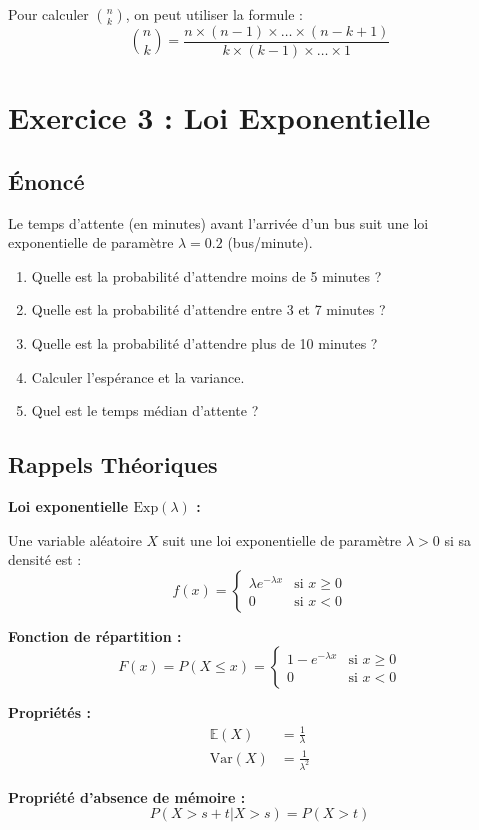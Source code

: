 \documentclass[11pt,a4paper]{article}
\newcommand{\Var}{\text{Var}}
\newcommand{\E}{\mathbb{E}}
\newcommand{\Exp}{\text{Exp}}
\begin{document}
\begin{attentionbox}
Pour calculer $\binom{n}{k}$, on peut utiliser la formule :
$$\binom{n}{k} = \frac{n \times (n-1) \times \ldots \times (n-k+1)}{k \times (k-1) \times \ldots \times 1}$$
\end{attentionbox}

\newpage

\section{Exercice 3 : Loi Exponentielle}

\subsection{Énoncé}

Le temps d'attente (en minutes) avant l'arrivée d'un bus suit une loi exponentielle de paramètre $\lambda = 0.2$ (bus/minute).

\begin{enumerate}
    \item Quelle est la probabilité d'attendre moins de 5 minutes ?
    \item Quelle est la probabilité d'attendre entre 3 et 7 minutes ?
    \item Quelle est la probabilité d'attendre plus de 10 minutes ?
    \item Calculer l'espérance et la variance.
    \item Quel est le temps médian d'attente ?
\end{enumerate}

\subsection{Rappels Théoriques}

\begin{rappelbox}
\textbf{Loi exponentielle $\Exp(\lambda)$ :}

Une variable aléatoire $X$ suit une loi exponentielle de paramètre $\lambda > 0$ si sa densité est :
$$f(x) = \begin{cases}
\lambda e^{-\lambda x} & \text{si } x \geq 0 \\
0 & \text{si } x < 0
\end{cases}$$

\textbf{Fonction de répartition :}
$$F(x) = P(X \leq x) = \begin{cases}
1 - e^{-\lambda x} & \text{si } x \geq 0 \\
0 & \text{si } x < 0
\end{cases}$$

\textbf{Propriétés :}
\begin{align}
\E(X) &= \frac{1}{\lambda} \\
\Var(X) &= \frac{1}{\lambda^2}
\end{align}

\textbf{Propriété d'absence de mémoire :}
$$P(X > s + t | X > s) = P(X > t)$$
\end{rappelbox}
\end{document}
